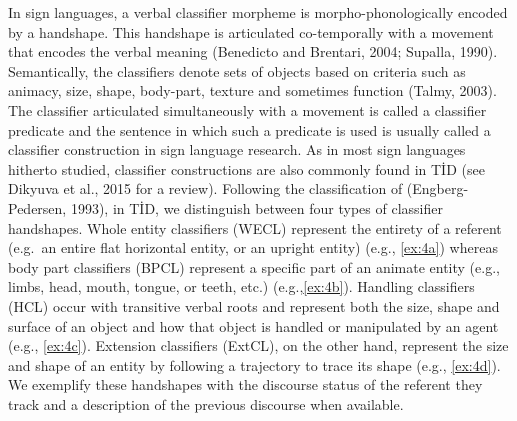 \documentclass[]{elsarticle} %
\begin{document}
In sign languages, a verbal classifier morpheme is morpho-phonologically
encoded by a handshape. This handshape is articulated co-temporally with
a movement that encodes the verbal meaning (Benedicto and Brentari,
2004; Supalla, 1990). Semantically, the classifiers denote sets of
objects based on criteria such as animacy, size, shape, body-part,
texture and sometimes function (Talmy, 2003). The classifier articulated
simultaneously with a movement is called a classifier predicate and the
sentence in which such a predicate is used is usually called a
classifier construction in sign language research. As in most sign
languages hitherto studied, classifier constructions are also commonly
found in TİD (see Dikyuva et al., 2015 for a review). Following the
classification of (Engberg-Pedersen, 1993), in TİD, we distinguish
between four types of classifier handshapes. Whole entity classifiers
(WECL) represent the entirety of a referent (e.g.~an entire flat
horizontal entity, or an upright entity) (e.g., \ref{ex:4a}) whereas
body part classifiers (BPCL) represent a specific part of an animate
entity (e.g., limbs, head, mouth, tongue, or teeth, etc.)
(e.g.,\ref{ex:4b}). Handling classifiers (HCL) occur with transitive
verbal roots and represent both the size, shape and surface of an object
and how that object is handled or manipulated by an agent (e.g.,
\ref{ex:4c}). Extension classifiers (ExtCL), on the other hand,
represent the size and shape of an entity by following a trajectory to
trace its shape (e.g., \ref{ex:4d}). We exemplify these handshapes with
the discourse status of the referent they track and a description of the
previous discourse when available.
\end{document}
